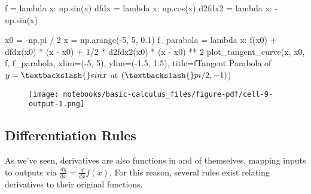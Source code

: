 \documentclass[
  letterpaper,
  DIV=11,
  numbers=noendperiod]{scrreprt}
\newenvironment{Shaded}{\begin{snugshade}}{\end{snugshade}}
\newcommand{\DecValTok}[1]{\textcolor[rgb]{0.68,0.00,0.00}{#1}}
\newcommand{\FloatTok}[1]{\textcolor[rgb]{0.68,0.00,0.00}{#1}}
\newcommand{\KeywordTok}[1]{\textcolor[rgb]{0.00,0.23,0.31}{#1}}
\newcommand{\NormalTok}[1]{\textcolor[rgb]{0.00,0.23,0.31}{#1}}
\newcommand{\OperatorTok}[1]{\textcolor[rgb]{0.37,0.37,0.37}{#1}}
\newcommand{\SpecialStringTok}[1]{\textcolor[rgb]{0.13,0.47,0.30}{#1}}
\begin{document}
\begin{Shaded}
\begin{Highlighting}[]
\NormalTok{f }\OperatorTok{=} \KeywordTok{lambda}\NormalTok{ x: np.sin(x)}
\NormalTok{dfdx }\OperatorTok{=} \KeywordTok{lambda}\NormalTok{ x: np.cos(x)}
\NormalTok{d2fdx2 }\OperatorTok{=} \KeywordTok{lambda}\NormalTok{ x: }\OperatorTok{{-}}\NormalTok{np.sin(x)}

\NormalTok{x0 }\OperatorTok{=} \OperatorTok{{-}}\NormalTok{np.pi }\OperatorTok{/} \DecValTok{2}
\NormalTok{x }\OperatorTok{=}\NormalTok{ np.arange(}\OperatorTok{{-}}\DecValTok{5}\NormalTok{, }\DecValTok{5}\NormalTok{, }\FloatTok{0.1}\NormalTok{)}
\NormalTok{f\_parabola }\OperatorTok{=} \KeywordTok{lambda}\NormalTok{ x: f(x0) }\OperatorTok{+}\NormalTok{ dfdx(x0) }\OperatorTok{*}\NormalTok{ (x }\OperatorTok{{-}}\NormalTok{ x0) }\OperatorTok{+} \DecValTok{1}\OperatorTok{/}\DecValTok{2} \OperatorTok{*}\NormalTok{ d2fdx2(x0) }\OperatorTok{*}\NormalTok{ (x }\OperatorTok{{-}}\NormalTok{ x0) }\OperatorTok{**} \DecValTok{2}
\NormalTok{plot\_tangent\_curve(x, x0, f, f\_parabola, xlim}\OperatorTok{=}\NormalTok{(}\OperatorTok{{-}}\DecValTok{5}\NormalTok{, }\DecValTok{5}\NormalTok{), ylim}\OperatorTok{=}\NormalTok{(}\OperatorTok{{-}}\FloatTok{1.5}\NormalTok{, }\FloatTok{1.5}\NormalTok{), }
\NormalTok{                   title}\OperatorTok{=}\SpecialStringTok{f\textquotesingle{}Tangent Parabola of $y=\textbackslash{}sin x$ at $(\textbackslash{}pi/2, {-}1)$\textquotesingle{}}\NormalTok{)}
\end{Highlighting}
\end{Shaded}

\begin{figure}[H]

{\centering \texttt{[image: notebooks/basic-calculus\_files/figure-pdf/cell-9-output-1.png]}

}

\end{figure}

\hypertarget{differentiation-rules}{%
\subsection{Differentiation Rules}\label{differentiation-rules}}

As we've seen, derivatives are also functions in and of themselves,
mapping inputs to outputs via \(\frac{dy}{dx} = \frac{d}{dx}f(x)\). For
this reason, several rules exist relating derivatives to their original
functions.
\end{document}
